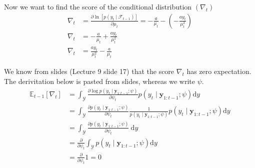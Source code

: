 \documentclass{article}
\begin{document}
Now we want to find the score of the conditional distribution $\left(\nabla_{t}\right)$
\begin{align*}
\nabla_{t} & =\frac{\partial\ln\left[p\left(y_{t}\mid\mathcal{F}_{t-1}\right)\right]}{\partial\mu_{t}}=-\frac{a}{\mu_{t}}-\left(-\frac{ay_{t}}{\mu_{t}^{2}}\right)\\
\nabla_{t} & =-\frac{a}{\mu_{t}}+\frac{ay_{t}}{\mu_{t}^{2}}\\
\nabla_{t} & =\frac{ay_{t}}{\mu_{t}^{2}}-\frac{a}{\mu_{t}}
\end{align*}

We know from slides (Lecture 9 slide 17) that the score $\nabla_{t}$
has zero expectation. The derivitation below is pasted from slides,
whereas we write $\psi$.
\[
\begin{aligned}\mathbb{E}_{t-1}\left[\nabla_{t}\right] & =\int_{\mathcal{Y}}\frac{\partial\log p\left(y_{t}\mid\mathbf{y}_{1:t-1};\psi\right)}{\partial\psi_{t}}p\left(y_{t}\mid\mathbf{y}_{1:t-1};\psi\right)\mathrm{d}y\\
 & =\int_{\mathcal{Y}}\frac{\partial p\left(y_{t}\mid\mathbf{y}_{1:t-1};\psi\right)}{\partial\psi_{t}}\frac{1}{p\left(y_{t}\mid\mathbf{y}_{1:t-1};\psi\right)}p\left(y_{t}\mid\mathbf{y}_{1:t-1};\psi\right)\mathrm{d}y\\
 & =\int_{\mathcal{Y}}\frac{\partial p\left(y_{t}\mid\mathbf{y}_{1:t-1};\psi\right)}{\partial\psi_{t}}\mathrm{~d}y\\
 & =\frac{\partial}{\partial\psi_{t}}\int_{\mathcal{Y}}p\left(y_{t}\mid\mathbf{y}_{1:t-1};\psi\right)\mathrm{d}y\\
 & =\frac{\partial}{\partial\psi_{t}}1=0
\end{aligned}
\]
\end{document}
